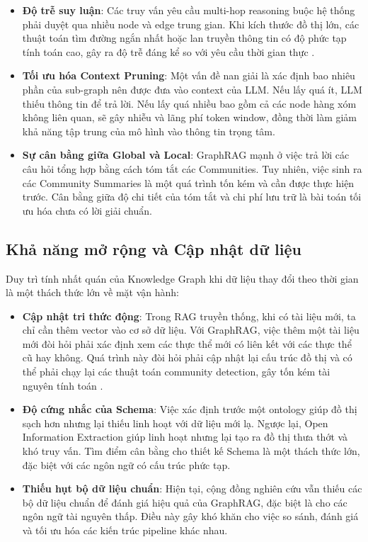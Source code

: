 \begin{itemize}
    \item \textbf{Độ trễ suy luận}: Các truy vấn yêu cầu multi-hop reasoning buộc hệ thống phải duyệt qua nhiều node và edge trung gian. Khi kích thước đồ thị lớn, các thuật toán tìm đường ngắn nhất hoặc lan truyền thông tin có độ phức tạp tính toán cao, gây ra độ trễ đáng kể so với yêu cầu thời gian thực \cite{shao2023enhancing}.
    
    \item \textbf{Tối ưu hóa Context Pruning}: Một vấn đề nan giải là xác định bao nhiêu phần của sub-graph nên được đưa vào context của LLM. Nếu lấy quá ít, LLM thiếu thông tin để trả lời. Nếu lấy quá nhiều bao gồm cả các node hàng xóm không liên quan, sẽ gây nhiễu và lãng phí token window, đồng thời làm giảm khả năng tập trung của mô hình vào thông tin trọng tâm.
    
    \item \textbf{Sự cân bằng giữa Global và Local}: GraphRAG mạnh ở việc trả lời các câu hỏi tổng hợp bằng cách tóm tắt các Communities. Tuy nhiên, việc sinh ra các Community Summaries là một quá trình tốn kém và cần được thực hiện trước. Cân bằng giữa độ chi tiết của tóm tắt và chi phí lưu trữ là bài toán tối ưu hóa chưa có lời giải chuẩn.
\end{itemize}

\subsection{Khả năng mở rộng và Cập nhật dữ liệu}
Duy trì tính nhất quán của Knowledge Graph khi dữ liệu thay đổi theo thời gian là một thách thức lớn về mặt vận hành:

\begin{itemize}
    \item \textbf{Cập nhật tri thức động}: Trong RAG truyền thống, khi có tài liệu mới, ta chỉ cần thêm vector vào cơ sở dữ liệu. Với GraphRAG, việc thêm một tài liệu mới đòi hỏi phải xác định xem các thực thể mới có liên kết với các thực thể cũ hay không. Quá trình này đòi hỏi phải cập nhật lại cấu trúc đồ thị và có thể phải chạy lại các thuật toán community detection, gây tốn kém tài nguyên tính toán \cite{gao2023retrieval}.
    
    \item \textbf{Độ cứng nhắc của Schema}: Việc xác định trước một ontology giúp đồ thị sạch hơn nhưng lại thiếu linh hoạt với dữ liệu mới lạ. Ngược lại, Open Information Extraction giúp linh hoạt nhưng lại tạo ra đồ thị thưa thớt và khó truy vấn. Tìm điểm cân bằng cho thiết kế Schema là một thách thức lớn, đặc biệt với các ngôn ngữ có cấu trúc phức tạp.
    
    \item \textbf{Thiếu hụt bộ dữ liệu chuẩn}: Hiện tại, cộng đồng nghiên cứu vẫn thiếu các bộ dữ liệu chuẩn để đánh giá hiệu quả của GraphRAG, đặc biệt là cho các ngôn ngữ tài nguyên thấp. Điều này gây khó khăn cho việc so sánh, đánh giá và tối ưu hóa các kiến trúc pipeline khác nhau.
\end{itemize}